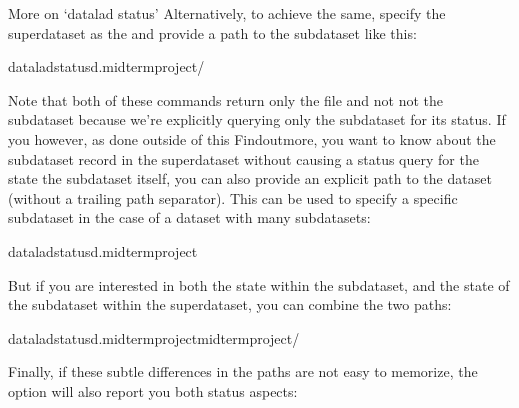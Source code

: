 \begin{findoutmore}[label={fom-status}, before title={\thetcbcounter\ }, float, check odd page=true]{More on ‘datalad status’}
\sphinxAtStartPar
Alternatively, to achieve the same, specify the superdataset as the 
and provide a path to the subdataset  like
this:

\begin{sphinxVerbatim}[commandchars=\\\{\}]
dataladstatus\PYGZhy{}d.midterm\PYGZus{}project/
\end{sphinxVerbatim}

\sphinxAtStartPar
Note that both of these commands return only the  file and not
not the  subdataset because we’re explicitly querying only the
subdataset for its status.
If you however, as done outside of this Find\sphinxhyphen{}out\sphinxhyphen{}more, you want to know about
the subdataset record in the superdataset without causing a status query for
the state  the subdataset itself, you can also provide an explicit
path to the dataset (without a trailing path separator). This can be used
to specify a specific subdataset in the case of a dataset with many subdatasets:

\begin{sphinxVerbatim}[commandchars=\\\{\}]
dataladstatus\PYGZhy{}d.midterm\PYGZus{}project
\end{sphinxVerbatim}

\sphinxAtStartPar
But if you are interested in both the state within the subdataset, and
the state of the subdataset within the superdataset, you can combine the
two paths:

\begin{sphinxVerbatim}[commandchars=\\\{\}]
dataladstatus\PYGZhy{}d.midterm\PYGZus{}projectmidterm\PYGZus{}project/
\end{sphinxVerbatim}

\sphinxAtStartPar
Finally, if these subtle differences in the paths are not easy to memorize,
the  option will also report you both status aspects:


\end{findoutmore}
